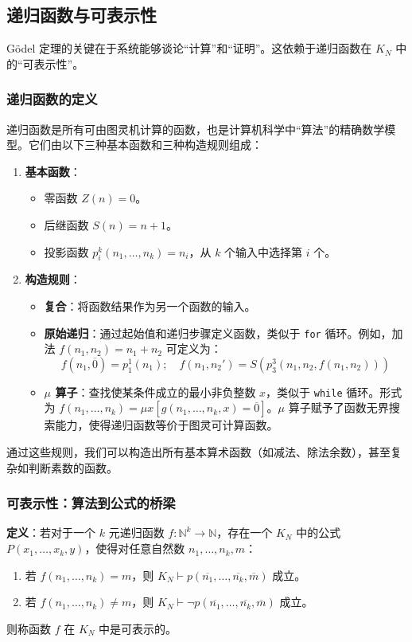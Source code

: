 \documentclass[a4paper,12pt]{ctexart}
\begin{document}
\subsection{递归函数与可表示性}
Gödel 定理的关键在于系统能够谈论“计算”和“证明”。这依赖于递归函数在 $K_N$ 中的“可表示性”。

\subsubsection{递归函数的定义}
递归函数是所有可由图灵机计算的函数，也是计算机科学中“算法”的精确数学模型。它们由以下三种基本函数和三种构造规则组成：
\begin{enumerate}[label=(\roman*)]
    \item \textbf{基本函数}：
    \begin{itemize}[leftmargin=*,noitemsep,topsep=0pt]
        \item 零函数 $Z(n)=0$。
        \item 后继函数 $S(n)=n+1$。
        \item 投影函数 $p_i^k(n_1, \dots, n_k) = n_i$，从 $k$ 个输入中选择第 $i$ 个。
    \end{itemize}
    \item \textbf{构造规则}：
    \begin{itemize}[leftmargin=*,noitemsep,topsep=0pt]
        \item \textbf{复合}：将函数结果作为另一个函数的输入。
        \item \textbf{原始递归}：通过起始值和递归步骤定义函数，类似于 \texttt{for} 循环。例如，加法 $f(n_1, n_2) = n_1 + n_2$ 可定义为：\[f(n_1, \overline{0}) = p_1^1(n_1);\quad f(n_1, n_2') = S(p_3^3(n_1, n_2, f(n_1, n_2)))\]
        \item \textbf{$\mu$ 算子}：查找使某条件成立的最小非负整数 $x$，类似于 \texttt{while} 循环。形式为 $f(n_1, \dots, n_k) = \mu x [g(n_1, \dots, n_k, x) = \overline{0}]$。$\mu$ 算子赋予了函数无界搜索能力，使得递归函数等价于图灵可计算函数。
    \end{itemize}
\end{enumerate}
通过这些规则，我们可以构造出所有基本算术函数（如减法、除法余数），甚至复杂如判断素数的函数。

\subsubsection{可表示性：算法到公式的桥梁}
\textbf{定义}：若对于一个 $k$ 元递归函数 $f: \mathbb{N}^k \rightarrow \mathbb{N}$，存在一个 $K_N$ 中的公式 $P(x_1, \dots, x_k, y)$，使得对任意自然数 $n_1, \dots, n_k, m$：
\begin{enumerate}[leftmargin=*,noitemsep,topsep=0pt]
    \item 若 $f(n_1, \dots, n_k) = m$，则 $K_N \vdash p(\overline{n_1}, \dots, \overline{n_k}, \overline{m})$ 成立。
    \item 若 $f(n_1, \dots, n_k) \ne m$，则 $K_N \vdash \neg p(\overline{n_1}, \dots, \overline{n_k}, \overline{m})$ 成立。
\end{enumerate}
则称函数 $f$ 在 $K_N$ 中是可表示的。
\end{document}
